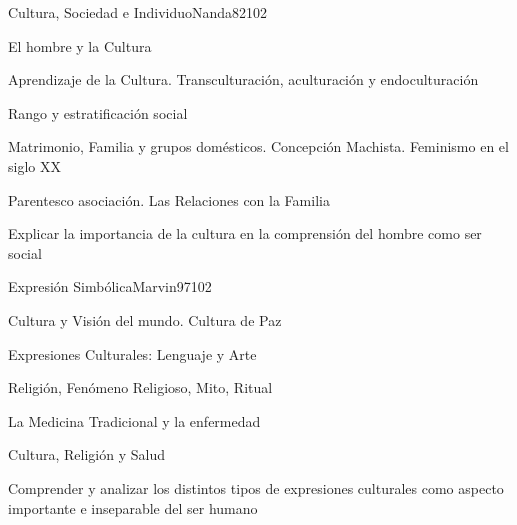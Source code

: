 \begin{syllabus}
\begin{unit}{Cultura, Sociedad e Individuo}{Nanda82}{10}{2}
   \begin{topics}
      \item El hombre y la Cultura
	\item Aprendizaje de la Cultura. Transculturación, aculturación y endoculturación
	\item Rango y estratificación social
	\item Matrimonio, Familia y grupos domésticos. Concepción Machista. Feminismo en el siglo XX
	\item Parentesco asociación. Las Relaciones con la Familia
   \end{topics}

   \begin{unitgoals}
      \item Explicar la importancia de la cultura en la comprensión del hombre como ser social
   \end{unitgoals}
\end{unit}

\begin{unit}{Expresión Simbólica}{Marvin97}{10}{2}
   \begin{topics}
      \item Cultura y Visión del mundo. Cultura de Paz
	\item Expresiones Culturales: Lenguaje y Arte
	\item Religión, Fenómeno Religioso, Mito, Ritual
	\item La Medicina Tradicional y la enfermedad
	\item Cultura, Religión y Salud
   \end{topics}

   \begin{unitgoals}
      \item Comprender y analizar los distintos tipos de expresiones culturales como aspecto importante e inseparable del ser humano
   \end{unitgoals}
\end{unit}

\begin{coursebibliography}
\end{coursebibliography}
\end{syllabus}
